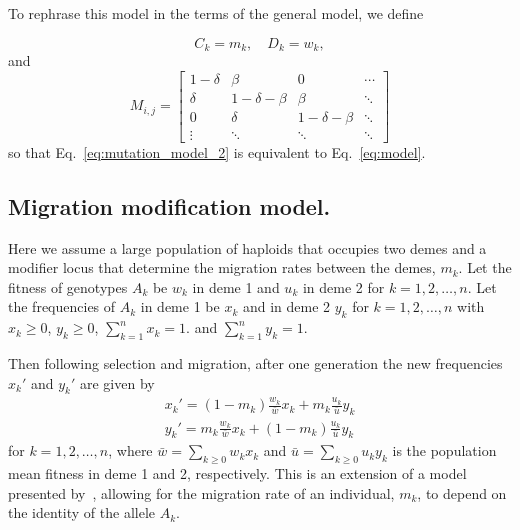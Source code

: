 \documentclass[9pt, a4paper, twocolumn]{extarticle}   	%
\begin{document}
To rephrase this model in the terms of the general model, we define

\begin{equation}
C_k = m_k, \quad
D_k = w_k,
\end{equation}
and
\begin{equation}
M_{i,j} = \begin{bmatrix}
1-\delta & \beta & 0 &  \cdots \\
\delta & 1-\delta-\beta & \beta &  \ddots \\
0 & \delta & 1-\delta-\beta & \ddots \\
\vdots & \ddots & \ddots & \ddots 
\end{bmatrix}
\end{equation}
so that Eq.~\ref{eq:mutation_model_2} is equivalent to Eq.~\ref{eq:model}.


\subsection*{Migration modification model.}

Here we assume a large population of haploids that occupies two demes and a modifier locus that determine the migration rates between the demes, $m_k$. 
Let the fitness of genotypes $A_k$ be $w_k$ in deme 1 and $u_k$ in deme 2 for $k=1,2,\ldots,n$.
Let the frequencies of $A_k$ in deme 1 be $x_k$ and in deme 2 $y_k$ for $k=1,2,\ldots,n$ with $x_k \ge 0$, $y_k \ge 0$, $\sum_{k=1}^{n}{x_k} = 1$. and $\sum_{k=1}^{n}{y_k} = 1$.

Then following selection and migration, after one generation the new frequencies $x_k'$ and $y_k'$ are given by
\begin{align}
x_k' = (1-m_k) \frac{w_k}{\bar{w}} x_k + m_k \frac{u_k}{\bar{u}} y_k \\
y_k' = m_k \frac{w_k}{\bar{w}} x_k + (1 - m_k) \frac{u_k}{\bar{u}} y_k
\end{align}
for $k=1,2,\ldots,n$, where $\bar{w} = \sum_{k \ge 0}{w_k x_k}$ and $\bar{u} = \sum_{k \ge 0}{u_k y_k}$ is the population mean fitness in deme 1 and 2, respectively.
This is an extension of a model presented by~\citet{Altenberg2017}, allowing for the migration rate of an individual, $m_k$, to depend on the identity of the allele $A_k$.
\end{document}
